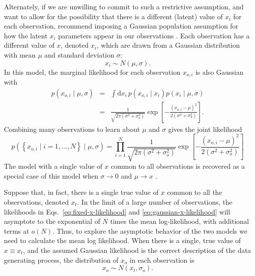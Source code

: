 \documentclass[modern]{aastex631}
\begin{document}
Alternately, if we are unwilling to commit to such a restrictive assumption, and
want to allow for the possibility that there is a different (latent) value of
$x_i$ for each observation, \citet{Isi2019} recommend imposing a Gaussian
population assumption for how the latent $x_i$ parameters appear in our
observations \citep{Isi2019,Isi2022}.  Each observation has a different value of
$x$, denoted $x_i$, which are drawn from a Gaussian distribution with mean $\mu$
and standard deviation $\sigma$:
\begin{equation}
    x_i \sim N\left( \mu, \sigma \right).
\end{equation}
In this model, the marginal likelihood for each observation $x_{o,i}$ is also
Gaussian with 
\begin{eqnarray}
    p\left( x_{o,i} \mid \mu, \sigma \right) & = & \int \mathrm{d} x_i \, p\left( x_{o,i} \mid x_i \right) p\left( x_i \mid \mu, \sigma \right) \nonumber \\ & = & \frac{1}{\sqrt{2 \pi \left( \sigma^2 + \sigma_o^2 \right)}} \exp\left[ -\frac{\left( x_{o,i} - \mu \right)^2}{2 \left( \sigma^2 + \sigma_o^2 \right)} \right].
\end{eqnarray}
Combining many observations to learn about $\mu$ and $\sigma$ gives the joint
likelihood 
\begin{equation}
    \label{eq:gaussian-x-likelihood}
    p\left( \left\{ x_{o,i} \mid i = 1, \ldots, N \right\} \mid \mu, \sigma \right) = \prod_{i=1}^N \frac{1}{\sqrt{2 \pi \left( \sigma^2 + \sigma_o^2 \right)}} \exp\left[ -\frac{\left( x_{o,i} - \mu \right)^2}{2 \left( \sigma^2 + \sigma_o^2 \right)} \right]
\end{equation}
The model with a single value of $x$ common to all observations is recovered as
a special case of this model when $\sigma \to 0$ and $\mu \to x$
\citep{Isi2019,Isi2022}.

Suppose that, in fact, there is a single true value of $x$ common to all the
observations, denoted $x_t$.  In the limit of a large number of observations,
the likelihoods in Eqs.\ \eqref{eq:fixed-x-likelihood} and
\eqref{eq:gaussian-x-likelihood} will asymptote to the exponential of $N$ times
the mean log-likelihood, with additional terms at $o(N)$.  Thus, to explore the
asymptotic behavior of the two models we need to calculate the mean log
likelihood.  When there is a single, true value of $x \equiv x_t$, and the
assumed Gaussian likelihood is the correct description of the data generating
process, the distribution of $x_{o}$ in each observation is 
\begin{equation}
    x_o \sim N\left( x_t, \sigma_o \right).
\end{equation}
\end{document}
